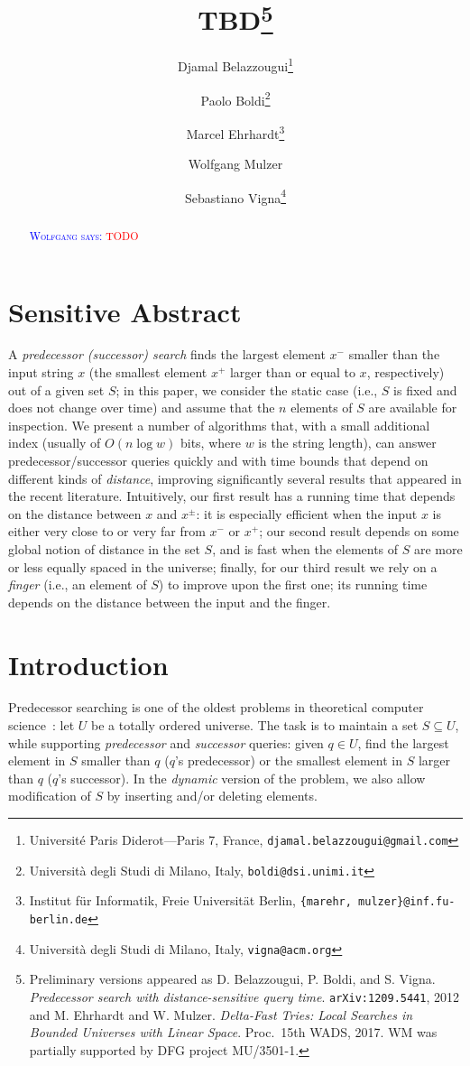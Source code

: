 \documentclass[a4paper,11pt]{article}
\title{TBD\footnote{
Preliminary versions appeared as 
D. Belazzougui, P. Boldi, and S. Vigna. 
\emph{Predecessor search with distance-sensitive query
time}. \texttt{arXiv:1209.5441}, 2012
and 
M. Ehrhardt and W. Mulzer.  \emph{Delta-Fast Tries: Local 
Searches in Bounded Universes with Linear Space}. Proc.~15th WADS,
2017.  WM was partially 
supported by DFG project MU/3501-1.}}
\author{Djamal Belazzougui\thanks{Universit\'e Paris 
        Diderot---Paris 7, France,
        \texttt{djamal.belazzougui@gmail.com}}
        \and
        Paolo Boldi\thanks{Universit\`a degli Studi di Milano, Italy, 
	\texttt{boldi@dsi.unimi.it}}
        \and
        Marcel Ehrhardt\thanks{Institut f\"ur Informatik, Freie 
	Universit\"at Berlin,
        \texttt{\{marehr, mulzer\}@inf.fu-berlin.de}}
        \and 
        Wolfgang Mulzer\footnotemark[4]
        \and 
        Sebastiano Vigna\thanks{Universit\`a 
	degli Studi di Milano, Italy, 
	\texttt{vigna@acm.org}}
        }
\date{}
\newcommand{\?}{\mskip1.5mu}
\newcommand{\aremark}[3]{\textcolor{blue}{\textsc{#1 #2:}}
  \textcolor{red}{\textsf{#3}}}
\newcommand{\wolfgang}[2][says]{\aremark{Wolfgang}{#1}{#2}}
\begin{document}
\maketitle

\begin{abstract}
\wolfgang{TODO}
\end{abstract}

\section{Sensitive Abstract}
A \emph{predecessor (successor) search} finds the largest element $x^-$ smaller
than the input string $x$ (the smallest element $x^+$ larger than or equal to
$x$, respectively) out of a given set $S$; in this paper, we consider
the static case (i.e., $S$ is fixed and does not change over time) and assume that
the $n$ elements of $S$ are available for inspection. We present a number of
algorithms that, with a small additional index (usually of $O(n\log w)$ bits,
where $w$ is the string length), can answer predecessor/successor queries
quickly and with time bounds that depend on different kinds of \emph{distance},
improving significantly several results that appeared in the recent literature.
Intuitively, our first result has a running time that depends on the distance
between $x$ and $x^\pm$: it is especially efficient when the input $x$ is
either very close to or very far from $x^-$ or $x^+$; our second result depends on some global notion of distance in the set $S$,
and is fast when the elements of $S$ are more or less equally spaced in the universe; finally, for our third result
we rely on a \emph{finger} (i.e., an element of $S$) to improve upon the first
one; its running time depends on the distance between the input and the
finger.

\section{Introduction}

Predecessor searching is one of the oldest problems in theoretical 
computer science~\cite{CormenLeRiSt09,Knuth98}: let $U$ be a totally
ordered universe. The task is to maintain a set $S \subseteq U$, 
while supporting \emph{predecessor} and \emph{successor} queries: 
given $q \in U$, find the largest element in $S$ smaller than $q$ 
($q$'s predecessor) or the smallest element in $S$ larger than $q$ 
($q$'s successor). In the \emph{dynamic} version of the problem, we
also allow modification of $S$ by inserting and/or deleting elements.
\end{document}
